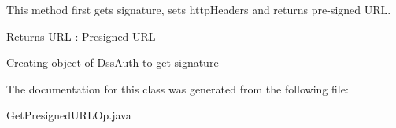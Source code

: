 This method first gets signature, sets http\+Headers and returns pre-\/signed U\+RL. 

\begin{DoxyReturn}{Returns}
U\+RL \+: Presigned U\+RL 
\end{DoxyReturn}
Creating object of Dss\+Auth to get signature 

The documentation for this class was generated from the following file\+:\begin{DoxyCompactItemize}
\item 
Get\+Presigned\+U\+R\+L\+Op.\+java\end{DoxyCompactItemize}

